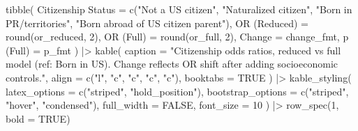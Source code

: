 \documentclass[
  letterpaper,
  DIV=11,
  numbers=noendperiod]{scrartcl}
\newenvironment{Shaded}{\begin{snugshade}}{\end{snugshade}}
\newcommand{\AttributeTok}[1]{\textcolor[rgb]{0.40,0.45,0.13}{#1}}
\newcommand{\ConstantTok}[1]{\textcolor[rgb]{0.56,0.35,0.01}{#1}}
\newcommand{\DecValTok}[1]{\textcolor[rgb]{0.68,0.00,0.00}{#1}}
\newcommand{\FunctionTok}[1]{\textcolor[rgb]{0.28,0.35,0.67}{#1}}
\newcommand{\NormalTok}[1]{\textcolor[rgb]{0.00,0.23,0.31}{#1}}
\newcommand{\OtherTok}[1]{\textcolor[rgb]{0.00,0.23,0.31}{#1}}
\newcommand{\SpecialCharTok}[1]{\textcolor[rgb]{0.37,0.37,0.37}{#1}}
\newcommand{\StringTok}[1]{\textcolor[rgb]{0.13,0.47,0.30}{#1}}
\begin{document}
\begin{Shaded}
\begin{Highlighting}[]
\FunctionTok{tibble}\NormalTok{(}
  \StringTok{\textasciigrave{}}\AttributeTok{Citizenship Status}\StringTok{\textasciigrave{}} \OtherTok{=} \FunctionTok{c}\NormalTok{(}\StringTok{"Not a US citizen"}\NormalTok{,}
                            \StringTok{"Naturalized citizen"}\NormalTok{,}
                            \StringTok{"Born in PR/territories"}\NormalTok{,}
                            \StringTok{"Born abroad of US citizen parent"}\NormalTok{),}
  \StringTok{\textasciigrave{}}\AttributeTok{OR (Reduced)}\StringTok{\textasciigrave{}}       \OtherTok{=} \FunctionTok{round}\NormalTok{(or\_reduced, }\DecValTok{2}\NormalTok{),}
  \StringTok{\textasciigrave{}}\AttributeTok{OR (Full)}\StringTok{\textasciigrave{}}          \OtherTok{=} \FunctionTok{round}\NormalTok{(or\_full, }\DecValTok{2}\NormalTok{),}
  \StringTok{\textasciigrave{}}\AttributeTok{Change}\StringTok{\textasciigrave{}}             \OtherTok{=}\NormalTok{ change\_fmt,}
  \StringTok{\textasciigrave{}}\AttributeTok{p (Full)}\StringTok{\textasciigrave{}}           \OtherTok{=}\NormalTok{ p\_fmt}
\NormalTok{) }\SpecialCharTok{|\textgreater{}}
  \FunctionTok{kable}\NormalTok{(}
    \AttributeTok{caption  =} \StringTok{"Citizenship odds ratios, reduced vs full model (ref: Born in US). Change reflects OR shift after adding socioeconomic controls."}\NormalTok{,}
    \AttributeTok{align    =} \FunctionTok{c}\NormalTok{(}\StringTok{"l"}\NormalTok{, }\StringTok{"c"}\NormalTok{, }\StringTok{"c"}\NormalTok{, }\StringTok{"c"}\NormalTok{, }\StringTok{"c"}\NormalTok{),}
    \AttributeTok{booktabs =} \ConstantTok{TRUE}
\NormalTok{  ) }\SpecialCharTok{|\textgreater{}}
  \FunctionTok{kable\_styling}\NormalTok{(}
    \AttributeTok{latex\_options     =} \FunctionTok{c}\NormalTok{(}\StringTok{"striped"}\NormalTok{, }\StringTok{"hold\_position"}\NormalTok{),}
    \AttributeTok{bootstrap\_options =} \FunctionTok{c}\NormalTok{(}\StringTok{"striped"}\NormalTok{, }\StringTok{"hover"}\NormalTok{, }\StringTok{"condensed"}\NormalTok{),}
    \AttributeTok{full\_width        =} \ConstantTok{FALSE}\NormalTok{,}
    \AttributeTok{font\_size         =} \DecValTok{10}
\NormalTok{  ) }\SpecialCharTok{|\textgreater{}}
  \FunctionTok{row\_spec}\NormalTok{(}\DecValTok{1}\NormalTok{, }\AttributeTok{bold =} \ConstantTok{TRUE}\NormalTok{)}


\end{Highlighting}
\end{Shaded}
\end{document}
